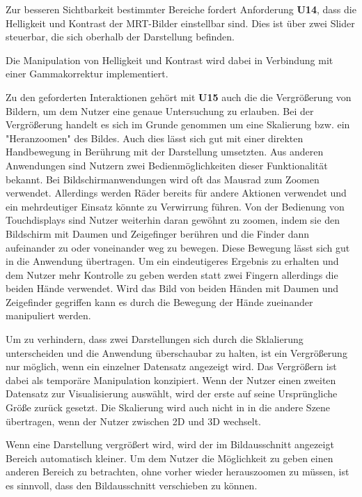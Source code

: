 Zur besseren Sichtbarkeit bestimmter Bereiche fordert Anforderung \textbf{U14}, dass die Helligkeit und Kontrast der MRT-Bilder einstellbar sind. Dies ist über zwei Slider steuerbar, die sich oberhalb der Darstellung befinden. 

Die Manipulation von Helligkeit und Kontrast wird dabei in Verbindung mit einer Gammakorrektur implementiert.

Zu den geforderten Interaktionen gehört mit \textbf{U15} auch die die Vergrößerung von Bildern, um dem Nutzer eine genaue Untersuchung zu erlauben. Bei der Vergrößerung handelt es sich im Grunde genommen um eine Skalierung bzw. ein "Heranzoomen" des Bildes. Auch dies lässt sich gut mit einer direkten Handbewegung in Berührung mit der Darstellung umsetzten. Aus anderen Anwendungen sind Nutzern zwei Bedienmöglichkeiten dieser Funktionalität bekannt. Bei Bildschirmanwendungen wird oft das Mausrad zum Zoomen verwendet. Allerdings werden Räder bereits für andere Aktionen verwendet und ein mehrdeutiger Einsatz könnte zu Verwirrung führen. Von der Bedienung von Touchdisplays sind Nutzer weiterhin daran gewöhnt zu zoomen, indem sie den Bildschirm mit Daumen und Zeigefinger berühren und die Finder dann aufeinander zu oder voneinander weg zu bewegen. Diese Bewegung lässt sich gut in die Anwendung übertragen. Um ein eindeutigeres Ergebnis zu erhalten und dem Nutzer mehr Kontrolle zu geben werden statt zwei Fingern allerdings die beiden Hände verwendet. Wird das Bild von beiden Händen mit Daumen und Zeigefinder gegriffen kann es durch die Bewegung der Hände zueinander manipuliert werden.

Um zu verhindern, dass zwei Darstellungen sich durch die Sklalierung unterscheiden und die Anwendung überschaubar zu halten, ist ein Vergrößerung nur möglich, wenn ein einzelner Datensatz angezeigt wird. 
Das Vergrößern ist dabei als temporäre Manipulation konzipiert. Wenn der Nutzer einen zweiten Datensatz zur Visualisierung auswählt, wird der erste auf seine Ursprüngliche Größe zurück gesetzt. Die Skalierung wird auch nicht in in die andere Szene übertragen, wenn der Nutzer zwischen 2D und 3D wechselt.

Wenn eine Darstellung vergrößert wird, wird der im Bildausschnitt angezeigt Bereich automatisch kleiner. Um dem Nutzer die Möglichkeit zu geben einen anderen Bereich zu betrachten, ohne vorher wieder herauszoomen zu müssen, ist es sinnvoll, dass den Bildausschnitt verschieben zu können. 

